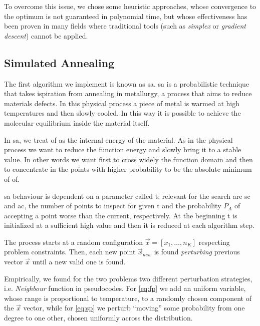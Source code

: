 \documentclass[12pt,journal,draftclsnofoot,onecolumn]{IEEEtran}
\begin{document}
To overcome this issue, we chose some heuristic approaches, whose convergence to the optimum is not guaranteed in polynomial time, but whose effectiveness has been proven in many fields \cite{Edelkamp2010} where traditional tools (such as \emph{simplex} or \emph{gradient descent}) cannot be applied.


\subsection{Simulated Annealing}

The first algorithm we implement is known as \gls{sa}.
\gls{sa} is a probabilistic technique that takes ispiration from annealing in metallurgy, a process that aims to reduce materials defects.
In this physical process a piece of metal is warmed at high temperatures and then slowly cooled. In this way it is possible to achieve the molecular equilibrium inside the material itself.

In \gls{sa}, we treat \gls{of} as the internal energy of the material.
As in the physical process we want to reduce the function energy and slowly bring it to a stable value. In other words we want first to cross widely the function domain and then to concentrate in the points with higher probability to be the absolute minimum of \gls{of}.

\gls{sa} behaviour is dependent on a parameter called \gls{t}: relevant for the search are \gls{sc} and \gls{ac}, the number of points to inspect for given \gls{t} and the probability $P_A$ of accepting a point worse than the current, respectively. At the beginning \gls{t} is initialized at a sufficient high value and then it is reduced at each algorithm step.

The process starts at a random configuration $\vec{x} = [x_1, \ldots, n_K]$ respecting problem constraints.
Then, each new point $\vec{x}_{new}$ is found \emph{perturbing} previous vector $\vec{x}$ until a new valid one is found.

Empirically, we found for the two problems two different perturbation strategies, i.e. \emph{Neighbour} function in pseudocodes.
For \autoref{eq:fp} we add an uniform variable, whose range is proportional to temperature, to a randomly chosen component of the $\vec{x}$ vector, while for \autoref{eq:sp} we perturb ``moving'' some probability from one degree to one other, chosen uniformly across the distribution.
\end{document}
